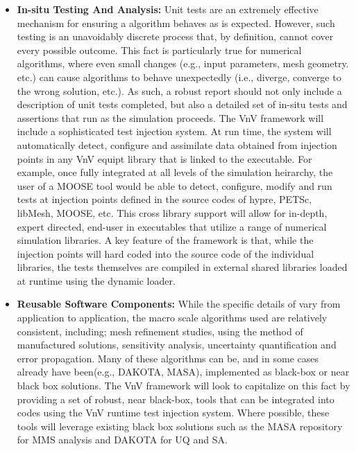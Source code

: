\begin{itemize}
 
 \item{ \bf In-situ Testing And Analysis:} Unit tests are an extremely effective mechanism for ensuring a algorithm behaves as is expected. However, such testing is an unavoidably discrete process that, by definition, cannot cover every possible outcome. This fact is particularly true for numerical algorithms, where even small changes (e.g., input parameters, mesh geometry. etc.) can cause algorithms to behave unexpectedly (i.e., diverge, converge to the wrong solution, etc.). As such, a robust \VV report should not only include a description of unit tests completed, but also a detailed set of in-situ tests and assertions that run as the simulation proceeds. The VnV framework will include a sophisticated test injection system. At run time, the system will automatically detect, configure and assimilate data obtained from injection points in any VnV equipt library that is linked to the executable. For example, once fully integrated at all levels of the simulation heirarchy, the user of a MOOSE tool would be able to detect, configure, modify and run tests at injection points defined in the source codes of hypre, PETSc, libMesh, MOOSE, etc. This cross library support will allow for in-depth, expert directed, end-user \VV in executables that utilize a range of numerical simulation libraries. A key feature of the framework is that, while the injection points will hard coded into the source code of the individual libraries, the tests themselves are compiled in external shared libraries loaded at runtime using the dynamic loader. 
 
 \item {\bf Reusable Software Components:} While the specific details of \VV vary from application to application, the macro scale algorithms used are relatively consistent, including; mesh refinement studies, using the method of manufactured solutions, sensitivity analysis, uncertainty quantification and error propagation. Many of these algorithms can be, and in some cases already have been(e.g., DAKOTA, MASA),  implemented as black-box or near black box solutions. The VnV framework will look to capitalize on this fact by providing a set of robust, near black-box, \VV tools that can be integrated into codes using the VnV runtime test injection system. Where possible, these tools will leverage existing black box solutions such as the MASA repository for MMS analysis and DAKOTA for UQ and SA.  
  

\end{itemize}

